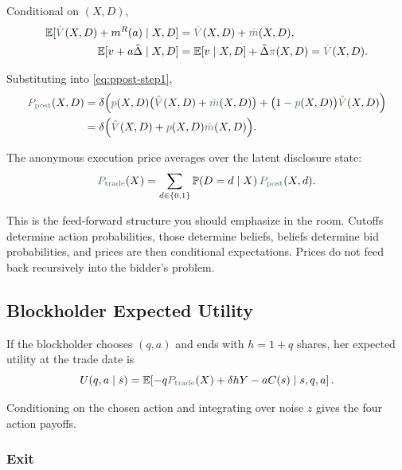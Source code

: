 \documentclass[11pt,a4paper]{article}
\theoremstyle{definition}
\theoremstyle{plain}
\theoremstyle{remark}
\newcommand{\E}{\mathbb{E}}
\newcommand{\PP}{\mathbb{P}}
\newcommand{\1}{\mathbf{1}}
\newcommand{\outcome}[1]{{\color{ForestGreen!50!black}#1}}
\begin{document}
Conditional on $(X,D)$,
\begin{align}
\E[\outcome{\hat V}(X,D)+m^R(a)\mid X,D]
&=
\outcome{\hat V}(X,D)+\outcome{\bar m}(X,D),
\label{eq:bid-payoff-exp} \\
\E[v+a\tilde{\Delta}\mid X,D]
&=
\E[v\mid X,D]+\tilde{\Delta}\outcome{\pi}(X,D)
=
\outcome{\hat V}(X,D).
\label{eq:stand-payoff-exp}
\end{align}

Substituting into \eqref{eq:ppost-step1},
\begin{align}
\outcome{P_{\textup{post}}}(X,D)
&=
\delta \Big(
\outcome{p}(X,D)\big(\outcome{\hat V}(X,D)+\outcome{\bar m}(X,D)\big)
+
\big(1-\outcome{p}(X,D)\big)\outcome{\hat V}(X,D)
\Big) \nonumber\\
&=
\delta \Big(
\outcome{\hat V}(X,D)+\outcome{p}(X,D)\outcome{\bar m}(X,D)
\Big).
\label{eq:ppost-main}
\end{align}

The anonymous execution price averages over the latent disclosure state:
\begin{equation}
\outcome{P_{\textup{trade}}}(X)
=
\sum_{d\in\{0,1\}} \PP(D=d\mid X)\,\outcome{P_{\textup{post}}}(X,d).
\label{eq:ptrade-main}
\end{equation}

\begin{intuitionbox}
This is the feed-forward structure you should emphasize in the room. Cutoffs determine action probabilities, those determine beliefs, beliefs determine bid probabilities, and prices are then conditional expectations. Prices do not feed back recursively into the bidder's problem.
\end{intuitionbox}

\subsection{Blockholder Expected Utility}

If the blockholder chooses $(q,a)$ and ends with $h=1+q$ shares, her expected utility at the trade date is
\begin{equation}
U(q,a\mid s)
=
\E\!\left[
-q\outcome{P_{\textup{trade}}}(X) + \delta hY - aC(s)
\;\middle|\;
s,q,a
\right].
\label{eq:u-general}
\end{equation}

Conditioning on the chosen action and integrating over noise $z$ gives the four action payoffs.

\subsubsection*{Exit}
\end{document}
